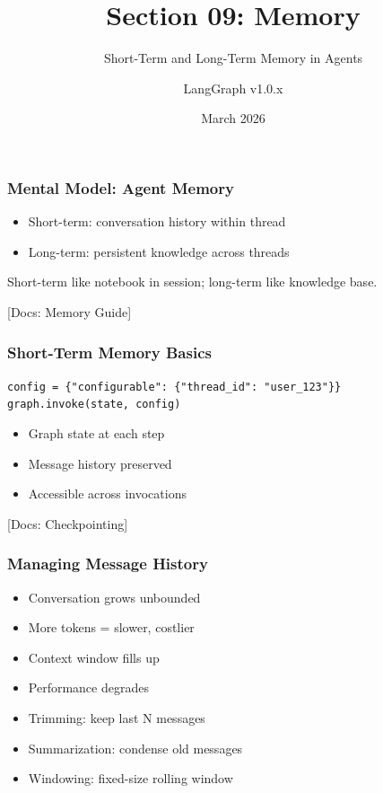 \documentclass[aspectratio=169,11pt]{beamer}
\title{Section 09: Memory}
\subtitle{Short-Term and Long-Term Memory in Agents}
\author{LangGraph v1.0.x}
\date{March 2026}
\newcommand{\docref}[1]{{\scriptsize\color{docgray}[Docs: #1]}}
\begin{document}
\frame{\titlepage}

\begin{frame}
\frametitle{Mental Model: Agent Memory}
\begin{conceptbox}
\setlength{\itemsep}{1pt}
\begin{itemize}
\item Short-term: conversation history within thread
\item Long-term: persistent knowledge across threads
\end{itemize}
\end{conceptbox}
\vspace{0.1cm}
\begin{tipbox}[Analogy]
Short-term like notebook in session; long-term like knowledge base.
\end{tipbox}
\docref{Memory Guide}
\end{frame}

\begin{frame}
\frametitle{Short-Term Memory Basics}
\begin{tipbox}
\texttt{config = \{"configurable": \{"thread\_id": "user\_123"\}\}}\\
\texttt{graph.invoke(state, config)}
\end{tipbox}
\vspace{0.1cm}
\begin{tipbox}
\setlength{\itemsep}{1pt}
\begin{itemize}
\item Graph state at each step
\item Message history preserved
\item Accessible across invocations
\end{itemize}
\end{tipbox}
\docref{Checkpointing}
\end{frame}

\begin{frame}
\frametitle{Managing Message History}
\begin{warningbox}
\setlength{\itemsep}{1pt}
\begin{itemize}
\item Conversation grows unbounded
\item More tokens = slower, costlier
\item Context window fills up
\item Performance degrades
\end{itemize}
\end{warningbox}
\vspace{0.1cm}
\begin{tipbox}[Solutions]
\setlength{\itemsep}{1pt}
\begin{itemize}
\item Trimming: keep last N messages
\item Summarization: condense old messages
\item Windowing: fixed-size rolling window
\end{itemize}
\end{tipbox}
\end{frame}
\end{document}
